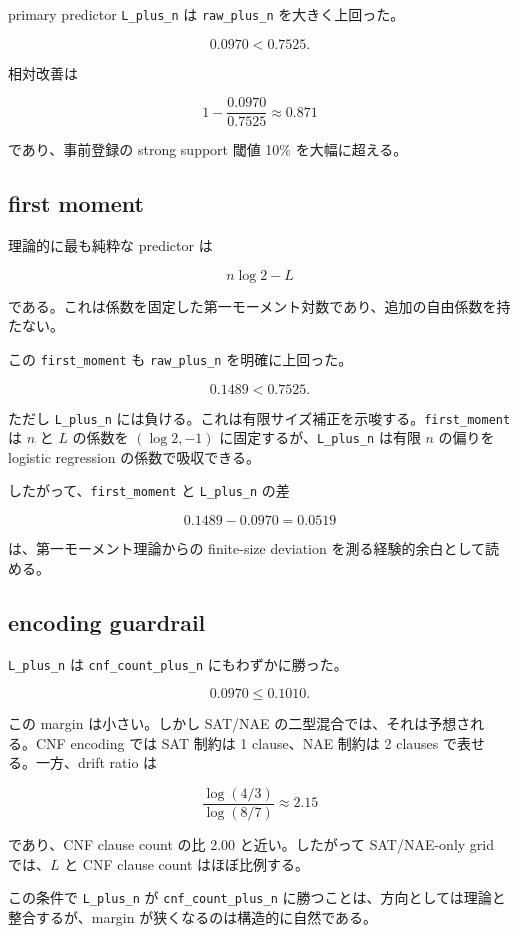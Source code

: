 \documentclass[12pt,a4paper]{article}
\begin{document}
primary predictor \texttt{L\_plus\_n} は \texttt{raw\_plus\_n} を大きく上回った。

\[
0.0970 < 0.7525.
\]

相対改善は

\[
1-\frac{0.0970}{0.7525}\approx 0.871
\]

であり、事前登録の strong support 閾値 10\% を大幅に超える。

\subsection{first moment}\label{first-moment}

理論的に最も純粋な predictor は

\[
n\log2-L
\]

である。これは係数を固定した第一モーメント対数であり、追加の自由係数を持たない。

この \texttt{first\_moment} も \texttt{raw\_plus\_n} を明確に上回った。

\[
0.1489 < 0.7525.
\]

ただし \texttt{L\_plus\_n} には負ける。これは有限サイズ補正を示唆する。\texttt{first\_moment} は \(n\) と \(L\) の係数を \((\log2,-1)\) に固定するが、\texttt{L\_plus\_n} は有限 \(n\) の偏りを logistic regression の係数で吸収できる。

したがって、\texttt{first\_moment} と \texttt{L\_plus\_n} の差

\[
0.1489-0.0970=0.0519
\]

は、第一モーメント理論からの finite-size deviation を測る経験的余白として読める。

\subsection{encoding guardrail}\label{encoding-guardrail}

\texttt{L\_plus\_n} は \texttt{cnf\_count\_plus\_n} にもわずかに勝った。

\[
0.0970 \le 0.1010.
\]

この margin は小さい。しかし SAT/NAE の二型混合では、それは予想される。CNF encoding では SAT 制約は 1 clause、NAE 制約は 2 clauses で表せる。一方、drift ratio は

\[
\frac{\log(4/3)}{\log(8/7)}\approx 2.15
\]

であり、CNF clause count の比 2.00 と近い。したがって SAT/NAE-only grid では、\(L\) と CNF clause count はほぼ比例する。

この条件で \texttt{L\_plus\_n} が \texttt{cnf\_count\_plus\_n} に勝つことは、方向としては理論と整合するが、margin が狭くなるのは構造的に自然である。
\end{document}
